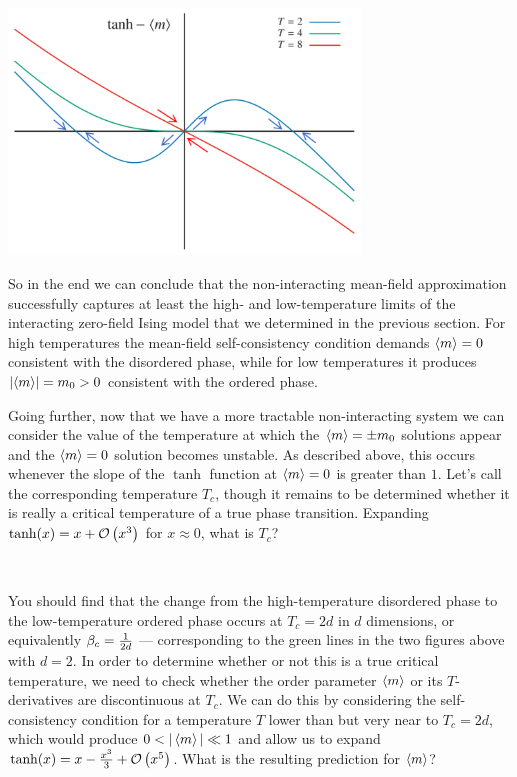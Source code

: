 \begin{center}\includegraphics[width=0.7\textwidth]{figs/unit09_consistency_flow.pdf}\end{center}

So in the end we can conclude that the non-interacting mean-field approximation successfully captures at least the high- and low-temperature limits of the interacting zero-field Ising model that we determined in the previous section.
For high temperatures the mean-field self-consistency condition demands $\left\langle m \right\rangle = 0$ consistent with the disordered phase, while for low temperatures it produces $|\!\left\langle m \right\rangle\!| = m_0 > 0$ consistent with the ordered phase. %

Going further, now that we have a more tractable non-interacting system we can consider the value of the temperature at which the $\left\langle m \right\rangle = \pm m_0$ solutions appear and the $\left\langle m \right\rangle = 0$ solution becomes unstable.
As described above, this occurs whenever the slope of the $\tanh$ function at $\left\langle m \right\rangle = 0$ is greater than $1$.
Let's call the corresponding temperature $T_c$, though it remains to be determined whether it is really a critical temperature of a true phase transition.
Expanding $\tanh(x) = x + \mathcal O\left(x^3\right)$ for $x \approx 0$, what is $T_c$?
\begin{mdframed}
  \ \\[50 pt]
\end{mdframed}

You should find that the change from the high-temperature disordered phase to the low-temperature ordered phase occurs at $T_c = 2d$ in $d$ dimensions, or equivalently $\beta_c = \frac{1}{2d}$ --- corresponding to the green lines in the two figures above with $d = 2$.
In order to determine whether or not this is a true critical temperature, we need to check whether the order parameter $\left\langle m \right\rangle$ or its $T$-derivatives are discontinuous at $T_c$.
We can do this by considering the self-consistency condition for a temperature $T$ lower than but very near to $T_c = 2d$, which would produce $0 < |\left\langle m \right\rangle| \ll 1$ and allow us to expand $\tanh(x) = x - \frac{x^3}{3} + \mathcal O\left(x^5\right)$.
What is the resulting prediction for $\left\langle m \right\rangle$?
\begin{mdframed}
  \ \\[100 pt]
\end{mdframed}

